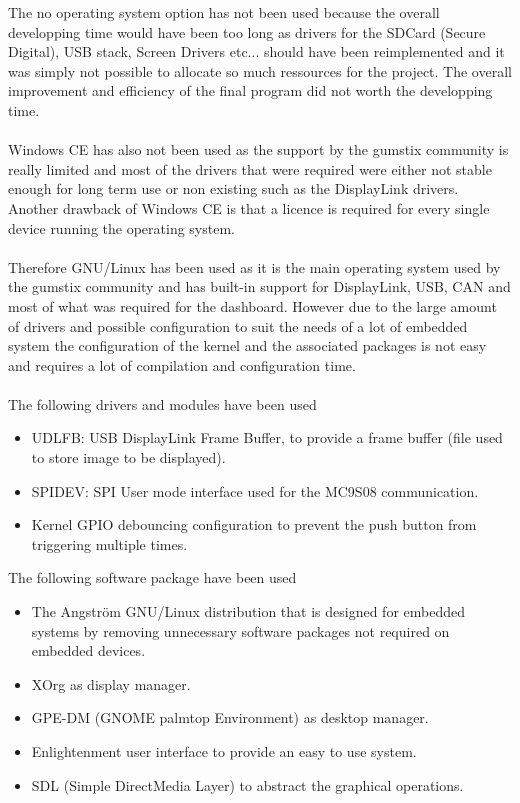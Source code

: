 \documentclass[11pt]{report} %
\begin{document}
	The no operating system option has not been used because the overall developping time
	would have been too long as drivers for the SDCard (Secure Digital), USB stack, 
	Screen Drivers etc... should have been reimplemented and it was simply not
	possible to allocate so much ressources for the project. The overall
	improvement and efficiency of the final program did not worth the developping
	time.\\
	\\
	Windows CE has also not been used as the support by the gumstix community is
	really limited and most of the drivers that were required were either not stable
	enough for long term use or non existing such as the DisplayLink drivers.
	Another drawback of Windows CE is that a licence is required for every single
	device running the operating system.\\
	\\
	Therefore GNU/Linux has been used as it is the main operating system used by
	the gumstix community and has built-in support for DisplayLink, USB, CAN and
	most of what was required for the dashboard. However due to the large amount
	of drivers and possible configuration to suit the needs of a lot of embedded system
	the configuration of the kernel and the associated packages is not easy and
	requires a lot of compilation and configuration time.\\
	\\
	The following drivers and modules have been used
	\begin{itemize}
		\item UDLFB: USB DisplayLink Frame Buffer, to provide a frame buffer (file 
		used to store image to be displayed).
		\item SPIDEV: SPI User mode interface used for the MC9S08 communication.
		\item Kernel GPIO debouncing configuration to prevent the push button from 
		triggering multiple times.
	\end{itemize}
	
	The following software package have been used
	\begin{itemize}
		\item The Angström GNU/Linux distribution that is designed for embedded systems
		by removing unnecessary software packages not required on embedded devices.
		\item XOrg as display manager.
		\item GPE-DM (GNOME palmtop Environment) as desktop manager.
		\item Enlightenment user interface to provide an easy to use system.
		\item SDL (Simple DirectMedia Layer) to abstract the graphical operations.
	\end{itemize}
\end{document}
